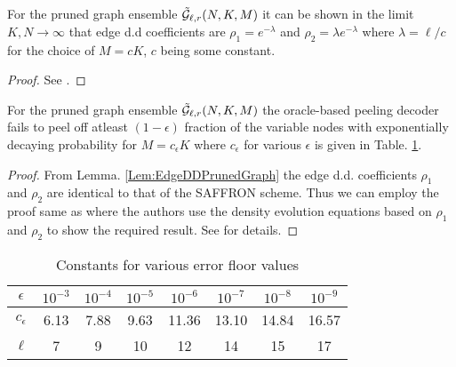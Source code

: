 \documentclass[conference,twocolumn]{IEEEtran}
\def\ceps{c_{\epsilon}}
\def\proofgap{-3ex}
\begin{document}
\begin{lemma}
\label{Lem:EdgeDDPrunedGraph}
For the pruned graph ensemble $\tilde{\mathcal{G}}_{\ell,r}(N,K,M)$ it can be shown in the limit $K,N\rightarrow\infty$ that edge d.d coefficients are $\rho_{1}=e^{-\lambda}$ and $\rho_{2}=\lambda e^{-\lambda}$ where $\lambda=\ell/c$ for the choice of $M=cK$, $c$ being some constant.
\end{lemma}
\vspace{\proofgap}
\begin{proof}
See \cite{vem2017regular}.
\end{proof}

\begin{lemma}
For the pruned graph ensemble $\tilde{\mathcal{G}}_{\ell,r}(N, K,M)$ the oracle-based peeling decoder fails to peel off atleast $(1-\epsilon)$ fraction of the variable nodes with exponentially decaying probability for $M=\ceps K$ where $\ceps$ for various $\epsilon$ is given in Table. \ref{Table:constantsDE}.
\label{Lem:PeelingRegularAnalysis}
\vspace{\proofgap}
\end{lemma}
\begin{proof}
From Lemma. \ref{Lem:EdgeDDPrunedGraph} the edge d.d. coefficients $\rho_1$ and $\rho_2$ are identical to that of the SAFFRON scheme. Thus we can employ the proof same as \cite[Thm.~4.1]{lee2015saffron} where the authors use the density evolution equations based on $\rho_1$ and $\rho_2$ to show the required result. See \cite{vem2017regular} for details.
\end{proof}

\begin{table}[h!]
\centering
\begin{tabular}{| c | c | c | c | c | c | c | c | }
\hline
$\epsilon$ & $10^{-3}$ & $10^{-4}$ & $10^{-5}$ & $10^{-6}$ &$ 10^{-7}$ & $10^{-8}$ & $10^{-9}$ \\ \hline
$\ceps$ & 6.13 & 7.88 & 9.63 & 11.36 & 13.10 & 14.84 & 16.57 \\ \hline
 $\ell$ & 7 & 9 & 10 & 12 & 14 & 15 & 17 \\ \hline
\end{tabular}
\vspace{1ex}
\caption{Constants for various error floor values}
\label{Table:constantsDE}
\end{table}
\end{document}
